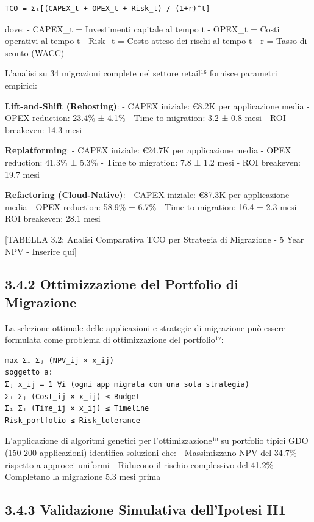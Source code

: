 \documentclass[12pt,a4paper,oneside]{book}
\numberwithin{figure}{chapter} %
\numberwithin{table}{chapter}  %
\begin{document}
\begin{verbatim}
TCO = Σₜ[(CAPEX_t + OPEX_t + Risk_t) / (1+r)^t]
\end{verbatim}

dove: - CAPEX\_t = Investimenti capitale al tempo t - OPEX\_t = Costi
operativi al tempo t - Risk\_t = Costo atteso dei rischi al tempo t - r
= Tasso di sconto (WACC)

L'analisi su 34 migrazioni complete nel settore retail¹⁶ fornisce
parametri empirici:

\textbf{Lift-and-Shift (Rehosting)}: - CAPEX iniziale: €8.2K per
applicazione media - OPEX reduction: 23.4\% ± 4.1\% - Time to migration:
3.2 ± 0.8 mesi - ROI breakeven: 14.3 mesi

\textbf{Replatforming}: - CAPEX iniziale: €24.7K per applicazione media
- OPEX reduction: 41.3\% ± 5.3\% - Time to migration: 7.8 ± 1.2 mesi -
ROI breakeven: 19.7 mesi

\textbf{Refactoring (Cloud-Native)}: - CAPEX iniziale: €87.3K per
applicazione media - OPEX reduction: 58.9\% ± 6.7\% - Time to migration:
16.4 ± 2.3 mesi - ROI breakeven: 28.1 mesi

{[}TABELLA 3.2: Analisi Comparativa TCO per Strategia di Migrazione - 5
Year NPV - Inserire qui{]}

\subsection{3.4.2 Ottimizzazione del Portfolio di
Migrazione}\label{ottimizzazione-del-portfolio-di-migrazione}

La selezione ottimale delle applicazioni e strategie di migrazione può
essere formulata come problema di ottimizzazione del portfolio¹⁷:

\begin{verbatim}
max Σᵢ Σⱼ (NPV_ij × x_ij)
soggetto a:
Σⱼ x_ij = 1 ∀i (ogni app migrata con una sola strategia)
Σᵢ Σⱼ (Cost_ij × x_ij) ≤ Budget
Σᵢ Σⱼ (Time_ij × x_ij) ≤ Timeline
Risk_portfolio ≤ Risk_tolerance
\end{verbatim}

L'applicazione di algoritmi genetici per l'ottimizzazione¹⁸ su portfolio
tipici GDO (150-200 applicazioni) identifica soluzioni che: -
Massimizzano NPV del 34.7\% rispetto a approcci uniformi - Riducono il
rischio complessivo del 41.2\% - Completano la migrazione 5.3 mesi prima

\subsection{3.4.3 Validazione Simulativa dell'Ipotesi H1}\label{validazione-simulativa-ipotesi-H1}
\end{document}
